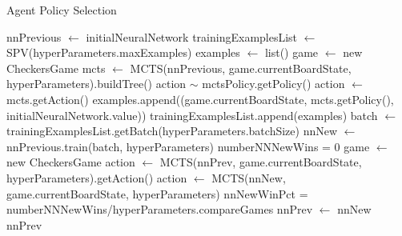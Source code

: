 \documentclass{article}
\begin{document}
    \begin{algorithm}
        \caption{Agent Policy Selection}\label{AgentTrainingAlg}
        \begin{algorithmic}
        
        \State nnPrevious $\gets$ initialNeuralNetwork
            \State trainingExamplesList $\gets$ SPV(hyperParameters.maxExamples)
                \State examples $\gets$ list()
                \State game $\gets$ new CheckersGame
                    \State mcts $\gets$ MCTS(nnPrevious, game.currentBoardState, hyperParameters).buildTree()
                        \State action $\sim$ mctsPolicy.getPolicy() 
                    \Else
                        \State action $\gets$ mcts.getAction()
                    \EndIf
                    \State examples.append((game.currentBoardState, mcts.getPolicy(), initialNeuralNetwork.value))
                \EndWhile
                \State trainingExamplesList.append(examples)
                    \State batch $\gets$ trainingExamplesList.getBatch(hyperParameters.batchSize)
                    \State nnNew $\gets$ nnPrevious.train(batch, hyperParameters)
                \EndFor
                \State numberNNNewWins = 0
                    \State game $\gets$ new CheckersGame
                            \State action $\gets$ MCTS(nnPrev, game.currentBoardState, hyperParameters).getAction()
                            \State action $\gets$ MCTS(nnNew, game.currentBoardState, hyperParameters)
                        \EndIf
                    \EndWhile
                \EndFor
                \State nnNewWinPct = numberNNNewWins/hyperParameters.compareGames
                    \State nnPrev $\gets$ nnNew
                \EndIf
            \EndFor
        \EndFor
        \State \Return nnPrev
        \EndFunction
        \end{algorithmic}
    \end{algorithm}
\end{document}
